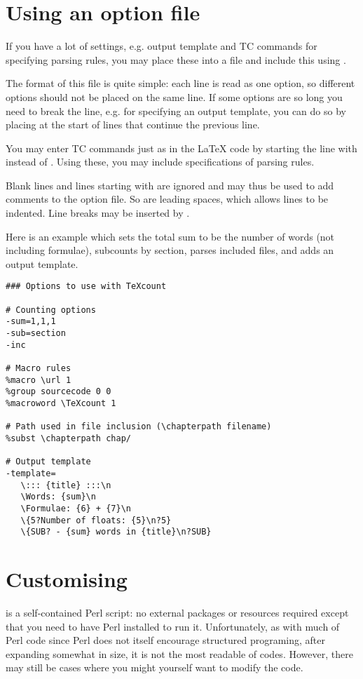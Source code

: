 \documentclass{article}
\begin{document}
\section{Using an option file}

If you have a lot of settings, e.g. output template and TC commands for specifying parsing rules, you may place these into a file and include this using .

The format of this file is quite simple: each line is read as one option, so different options should not be placed on the same line. If some options are so long you need to break the line, e.g. for specifying an output template, you can do so by placing \code{\bs{}} at the start of lines that continue the previous line.

You may enter TC commands just as in the \LaTeX{} code by starting the line with \code{\%} instead of . Using these, you may include specifications of parsing rules.

Blank lines and lines starting with \code{\#} are ignored and may thus be used to add comments to the option file. So are leading spaces, which allows lines to be indented. Line breaks may be inserted by .

Here is an example which sets the total sum to be the number of words (not including formulae), subcounts by section, parses included files, and adds an output template.

\begin{lstlisting}[frame=single]
### Options to use with TeXcount

# Counting options
-sum=1,1,1
-sub=section
-inc

# Macro rules
%macro \url 1
%group sourcecode 0 0
%macroword \TeXcount 1

# Path used in file inclusion (\chapterpath filename)
%subst \chapterpath chap/

# Output template
-template=
   \::: {title} :::\n
   \Words: {sum}\n
   \Formulae: {6} + {7}\n
   \{5?Number of floats: {5}\n?5}
   \{SUB? - {sum} words in {title}\n?SUB}
\end{lstlisting}



\section{Customising \TeXcount{}}

\TeXcount{} is a self-contained Perl script: no external packages or resources required except that you need to have Perl installed to run it. Unfortunately, as with much of Perl code since Perl does not itself encourage structured programing, after expanding somewhat in size, it is not the most readable of codes. However, there may still be cases where you might yourself want to modify the code.
\end{document}
